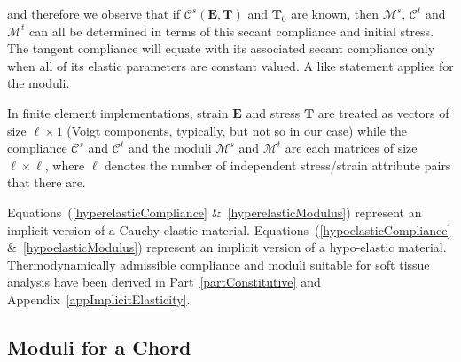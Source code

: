 and therefore we observe that if $\boldsymbol{\mathcal{C}}^s (\boldsymbol{E}, \boldsymbol{T})$ and $\boldsymbol{T}_0$ are known, then $\boldsymbol{\mathcal{M}}^s$, $\boldsymbol{\mathcal{C}}^t$ and $\boldsymbol{\mathcal{M}}^t$ can all be determined in terms of this secant compliance and initial stress.  The tangent compliance will equate with its associated secant compliance only when all of its elastic parameters are constant valued.  A like statement applies for the moduli.

In finite element implementations, strain $\boldsymbol{E}$ and stress $\boldsymbol{T}$ are treated as vectors of size $\ell \! \times \! 1$ (Voigt components, typically, but not so in our case) while the compliance $\boldsymbol{\mathcal{C}}^s$ and $\boldsymbol{\mathcal{C}}^t$ and the moduli $\boldsymbol{\mathcal{M}}^s$ and $\boldsymbol{\mathcal{M}}^t$ are each matrices of size $\ell \! \times \! \ell$, where $\ell$ denotes the number of independent stress\slash strain attribute pairs that there are.

Equations~(\ref{hyperelasticCompliance} \&\ \ref{hyperelasticModulus}) represent an implicit version of a Cauchy elastic material. Equations~(\ref{hypoelasticCompliance} \&\ \ref{hypoelasticModulus}) represent an implicit version of a hypo-elastic material.  Thermo\-dynamically admissible compliance and moduli suitable for soft tissue analysis have been derived in Part~\ref{partConstitutive} and Appendix~\ref{appImplicitElasticity}.


\subsection{Moduli for a Chord}


